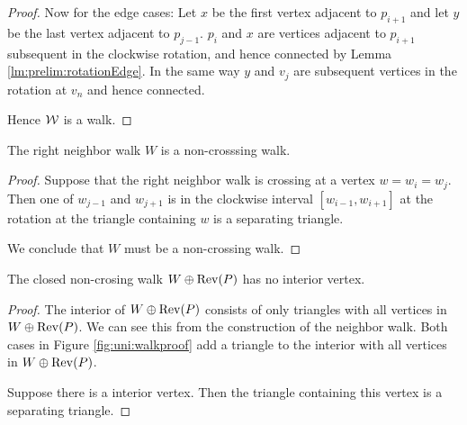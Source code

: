 \begin{proof}
    Now for the edge cases: Let $x$ be the first vertex adjacent to $p_{i+1}$ and let $y$ be the last vertex adjacent to $p_{j-1}$. $p_i$ and $x$ are vertices adjacent to $p_{i+1}$ subsequent in the clockwise rotation, and hence connected by Lemma \ref{lm:prelim:rotationEdge}. In the same way $y$ and $v_j$ are subsequent vertices in the rotation at $v_n$ and hence connected.

    Hence $\mathcal{W}$ is a walk.
  \end{proof}

  \begin{lemma}
    \label{lm:uni:neighborWalkNoncrossing}
    The right neighbor walk $W$ is a non-crosssing walk.
  \end{lemma}
  \begin{proof}
    Suppose that the right neighbor walk is crossing at a vertex $w= w_i =w_j$. Then one of $w_{j-1}$ and $w_{j+1}$ is in the clockwise interval $[w_{i-1}, w_{i+1} ]$ at the rotation at the triangle containing $w$ is a separating triangle.

    We conclude that $W$ must be a non-crossing walk.
  \end{proof}


  \begin{lemma}
    \label{lm:uni:neighbourwalkNoInteriorVertex}
    The closed non-crosing walk $W \oplus \operatorname{Rev}(P)$ has no interior vertex.
  \end{lemma}
  \begin{proof}
    The interior of $W \oplus \operatorname{Rev}(P)$ consists of only triangles with all vertices in $W \oplus \operatorname{Rev}(P)$. We can see this from the construction of the neighbor walk. Both cases in Figure \ref{fig:uni:walkproof} add a triangle to the interior with all vertices in $W \oplus \operatorname{Rev}(P)$.

    Suppose there is a interior vertex. Then the triangle containing this vertex is a separating triangle.
  \end{proof}


